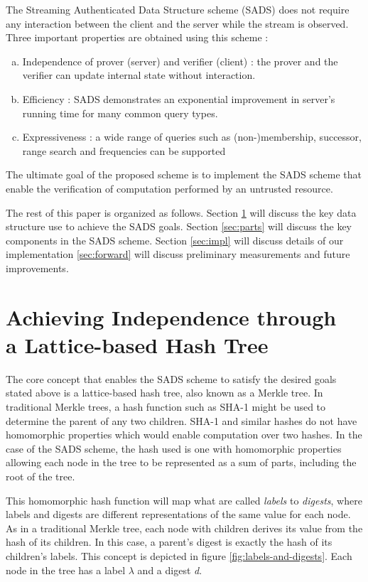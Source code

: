 \documentclass[11pt, letterpaper, oneside]{article}
\begin{document}
	The Streaming Authenticated Data Structure scheme (SADS) \cite{dads} does not require any interaction between the client and the server while the stream is observed.
	Three important properties are obtained using this scheme :
	\begin{enumerate}[a.]
		\item Independence of prover (server) and verifier (client) : the prover and the verifier can update internal state without interaction.
		\item Efficiency : SADS demonstrates an exponential improvement in server's running time for many common query types.
		\item Expressiveness : a wide range of queries such as (non-)membership, successor, range search and frequencies can be supported
	\end{enumerate} 
	The ultimate goal of the proposed scheme is to implement the SADS scheme that enable the verification of computation performed by an untrusted resource.
	
	The rest of this paper is organized as follows. 
	Section \ref{sec:tree} will discuss the key data structure use to achieve the SADS goals.
	Section \ref{sec:parts} will discuss the key components in the SADS scheme.
	Section \ref{sec:impl} will discuss details of our implementation \ref{sec:forward} will discuss preliminary measurements and future improvements. 
	
\section{ Achieving Independence through \\ a Lattice-based Hash Tree }
\label{sec:tree}

	The core concept that enables the SADS scheme to satisfy the desired goals stated above is a lattice-based hash tree, also known as a Merkle tree.
	In traditional Merkle trees, a hash function such as SHA-1 might be used to determine the parent of any two children.
	SHA-1 and similar hashes do not have homomorphic properties which would enable computation over two hashes.
	In the case of the SADS scheme, the hash used is one with homomorphic properties allowing each node in the tree to be represented as a sum of parts, including the root of the tree.
	
	This homomorphic hash function will map what are called \textit{labels} to \textit{digests}, where labels and digests are different representations of the same value for each node.
	As in a traditional Merkle tree, each node with children derives its value from the hash of its children.
	In this case, a parent's digest is exactly the hash of its children's labels.
	This concept is depicted in figure \ref{fig:labels-and-digests}.	
	Each node in the tree has a label $\lambda$ and a digest \textit{d}.
	
\end{document}
